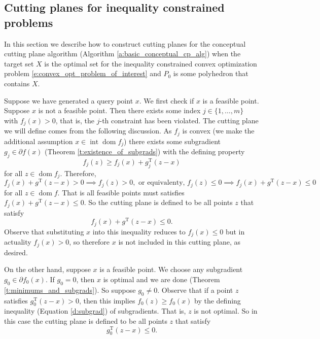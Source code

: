 \documentclass[11pt]{amsart}
\theoremstyle{definition}
\theoremstyle{remark}
\newcommand{\transpose}{\text{T}}
\DeclareMathOperator{\interior}{int}
\DeclareMathOperator{\domain}{dom}
\begin{document}
    \subsection{Cutting planes for inequality constrained problems}
        In this section we describe how to construct cutting planes for the conceptual cutting plane algorithm (Algorithm \eqref{a:basic_conceptual_cp_alg}) when the target set $X$ is the optimal set for the inequality constrained convex optimization problem \eqref{e:convex_opt_problem_of_interest} and $P_0$ is some polyhedron that contains $X$.

        Suppose we have generated a query point $x$. We first check if $x$ is a feasible point. Suppose $x$ is not a feasible point. Then there exists some index $j \in \{1, \dots, m\}$ with $f_j(x) > 0$, that is, the $j$-th constraint has been violated. The cutting plane we will define comes from the following discussion. As $f_j$ is convex (we make the additional assumption $x \in \interior \domain f_j$) there exists some subgradient $g_j \in \partial f(x)$ (Theorem \ref{t:existence_of_subgrads}) with the defining property
        \begin{equation*}
            f_j(z) \geq f_j(x) + g_j^\transpose(z-x)
        \end{equation*}
        for all $z \in \domain f_j$. Therefore,
        \begin{equation*}
            f_j(x) + g^\transpose(z-x) > 0 \implies f_j(z) > 0, \text{ or equivalenty, }
            f_j(z) \leq 0 \implies f_j(x) + g^\transpose(z-x) \leq 0
        \end{equation*}
        for all $z \in \domain f$. That is all feasible points must satisfies $f_j(x) + g^\transpose(z-x) \leq 0$. So the cutting plane is defined to be all points $z$ that satisfy
        \begin{equation*}
            f_j(x) + g^\transpose(z-x) \leq 0.
        \end{equation*}
        Observe that substituting $x$ into this inequality reduces to $f_j(x) \leq 0$ but in actuality $f_j(x) > 0$, so therefore $x$ is not included in this cutting plane, as desired. 

        On the other hand, suppose $x$ is a feasible point. We choose any subgradient $g_0 \in \partial f_0(x)$. If $g_0 = 0$, then $x$ is optimal and we are done (Theorem \ref{t:minimums_and_subgrads}). So suppose $g_0 \neq 0$. Observe that if a point $z$ satisfies $g_0^\transpose(z-x) > 0$, then this implies $f_0(z) \geq f_0(x)$ by the defining inequality (Equation \eqref{d:subgrad}) of subgradients. That is, $z$ is not optimal. So in this case the cutting plane is defined to be all points $z$ that satisfy
        \begin{equation*}
            g_0^\transpose(z-x) \leq 0.
        \end{equation*}
\end{document}
